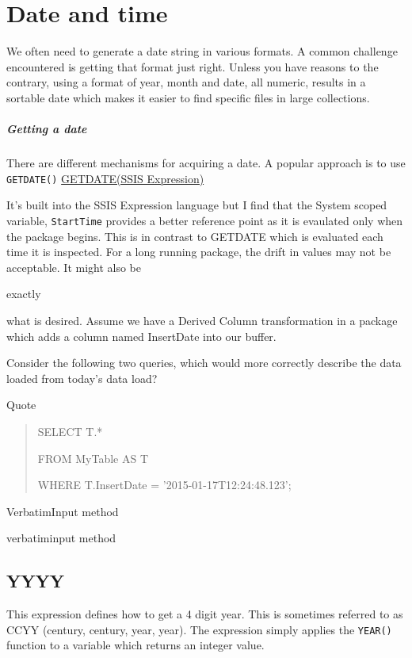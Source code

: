 \chapter{Date and time}
We often need to generate a date string in various formats. A common challenge encountered is getting that format just right.
Unless you have reasons to the contrary, using a format of year, month and date, all numeric, results in a sortable date which 
makes it easier to find specific files in large collections.

\paragraph{Getting a date}

There are different mechanisms for acquiring a date. A popular approach is to use \verb+GETDATE()+ \href{http://msdn.microsoft.com/en-us/library/ms139875.aspx}{GETDATE(SSIS Expression)}

It's built into the SSIS Expression language but I find that the System scoped variable, \verb+StartTime+ provides a better reference point as it is evaulated only when the package begins. This is in contrast to GETDATE which is evaluated each time it is inspected. For a long running package, the drift in values may not be acceptable. It might also be \begin{em}exactly\end{em} what is desired. Assume we have a Derived Column transformation in a package which adds a column named InsertDate into our buffer. 

Consider the following two queries, which would more correctly describe the data loaded from today's data load?

Quote
\begin{quote}
SELECT 
    T.*
    
FROM 
    MyTable AS T

WHERE 
    T.InsertDate = '2015-01-17T12:24:48.123'; 
\end{quote}

VerbatimInput method


verbatiminput method



\section{YYYY}
This expression defines how to get a 4 digit year. This is sometimes referred to as CCYY (century, century, year, year). The expression simply applies the \verb|YEAR()| function to a variable which returns an integer value. 


